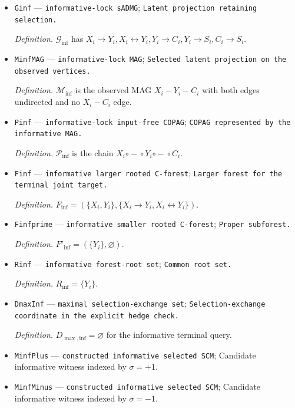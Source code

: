 \documentclass{article}
\begin{document}
\begin{itemize}
  \item \texttt{Ginf} --- \texttt{informative-\allowbreak{}lock sADMG}; \texttt{Latent projection retaining selection.}
  \par\smallskip\noindent\emph{Definition.} \(\mathcal G_{\mathrm{inf}}\) has \(X_i\to Y_i,X_i\leftrightarrow Y_i,Y_i\to C_i,Y_i\to S_i,C_i\to S_i\).
  \item \texttt{MinfMAG} --- \texttt{informative-\allowbreak{}lock MAG}; \texttt{Selected latent projection on the observed vertices.}
  \par\smallskip\noindent\emph{Definition.} \(\mathcal M_{\mathrm{inf}}\) is the observed MAG \(X_i-Y_i-C_i\) with both edges undirected and no \(X_i-C_i\) edge.
  \item \texttt{Pinf} --- \texttt{informative-\allowbreak{}lock input-\allowbreak{}free COPAG}; \texttt{COPAG represented by the informative MAG.}
  \par\smallskip\noindent\emph{Definition.} \(\mathcal P_{\mathrm{inf}}\) is the chain \(X_i\mathbin{\circ\!-\!\circ}Y_i\mathbin{\circ\!-\!\circ}C_i\).
  \item \texttt{Finf} --- \texttt{informative larger rooted C-\allowbreak{}forest}; \texttt{Larger forest for the terminal joint target.}
  \par\smallskip\noindent\emph{Definition.} \(F_{\mathrm{inf}}=(\{X_i,Y_i\},\{X_i\to Y_i,X_i\leftrightarrow Y_i\})\).
  \item \texttt{Finfprime} --- \texttt{informative smaller rooted C-\allowbreak{}forest}; \texttt{Proper subforest.}
  \par\smallskip\noindent\emph{Definition.} \(F'_{\mathrm{inf}}=(\{Y_i\},\varnothing)\).
  \item \texttt{Rinf} --- \texttt{informative forest-\allowbreak{}root set}; \texttt{Common root set.}
  \par\smallskip\noindent\emph{Definition.} \(R_{\mathrm{inf}}=\{Y_i\}\).
  \item \texttt{DmaxInf} --- \texttt{maximal selection-\allowbreak{}exchange set}; \texttt{Selection-\allowbreak{}exchange coordinate in the explicit hedge check.}
  \par\smallskip\noindent\emph{Definition.} \(D_{\max,\mathrm{inf}}=\varnothing\) for the informative terminal query.
  \item \texttt{MinfPlus} --- \texttt{constructed informative selected SCM}; Candidate informative witness indexed by \(\sigma=+1\).
  \item \texttt{MinfMinus} --- \texttt{constructed informative selected SCM}; Candidate informative witness indexed by \(\sigma=-1\).

\end{itemize}
\end{document}
